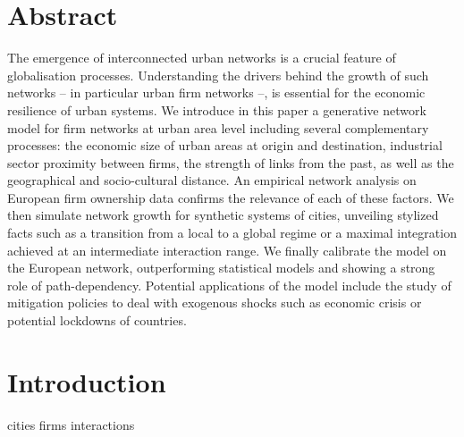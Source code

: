 \documentclass[10pt,letterpaper]{article}
\begin{document}
\section*{Abstract}
The emergence of interconnected urban networks is a crucial feature of globalisation processes. Understanding the drivers behind the growth of such networks -- in particular urban firm networks --, is essential for the economic resilience of urban systems. We introduce in this paper a generative network model for firm networks at urban area level including several complementary processes: the economic size of urban areas at origin and destination, industrial sector proximity between firms, the strength of links from the past, as well as the geographical and socio-cultural distance. An empirical network analysis on European firm ownership data confirms the relevance of each of these factors. We then simulate network growth for synthetic systems of cities, unveiling stylized facts such as a transition from a local to a global regime or a maximal integration achieved at an intermediate interaction range. We finally calibrate the model on the European network, outperforming statistical models and showing a strong role of path-dependency. Potential applications of the model include the study of mitigation policies to deal with exogenous shocks such as economic crisis or potential lockdowns of countries.

\linenumbers


\section*{Introduction}

\cite{derudder2018central}
\cite{storme2019introducing} cities firms interactions
\end{document}
